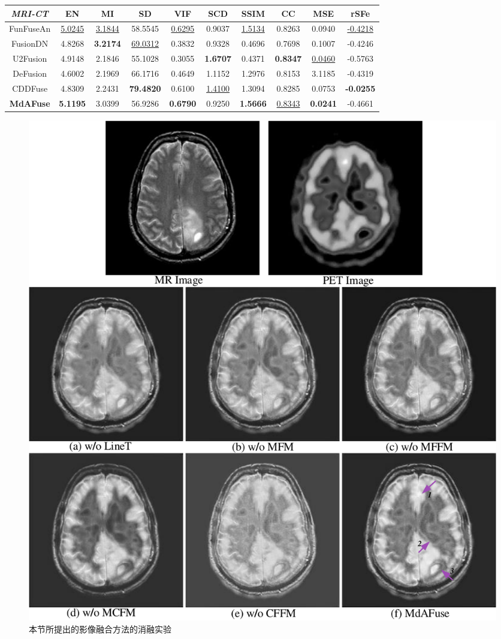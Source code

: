 \begin{table}[htb]
\begin{tabular}{cccccccccc}
\textit{MRI-CT}             & \textbf{EN}     & \textbf{MI}     & \textbf{SD}      & \textbf{VIF}   & \textbf{SCD}    & \textbf{SSIM}   & \textbf{CC}     & \textbf{MSE}    & \textbf{rSFe}    \\ \hline
FunFuseAn                 & \underline{ 5.0245}    & \underline{ 3.1844}    & 58.5545          & \underline{ 0.6295}    & 0.9037          & \underline{ 1.5134}    & 0.8263          & 0.0940          & \underline{ -0.4218}    \\
FusionDN                   & 4.8268          & \textbf{3.2174} & \underline{ 69.0312}    & 0.3832          & 0.9328          & 0.4696          & 0.7698          & 0.1007          & -0.4246          \\
U2Fusion                     & 4.9148          & 2.1846          & 55.1028          & 0.3055          & \textbf{1.6707} & 0.4371          & \textbf{0.8347} & \underline{ 0.0460}    & -0.5763          \\
DeFusion                       & 4.6002          & 2.1969          & 66.1716          & 0.4649          & 1.1152          & 1.2976          & 0.8153          & 3.1185          & -0.4319          \\
CDDFuse                  & 4.8309          & 2.2431          & \textbf{79.4820} & 0.6100          & \underline{ 1.4100}    & 1.3094          & 0.8285          & 0.0753          & \textbf{-0.0255} \\
\textbf{MdAFuse}                    & \textbf{5.1195} & 3.0399          & 56.9286          & \textbf{0.6790} & 0.9250          & \textbf{1.5666} & \underline{ 0.8343}    & \textbf{0.0241} & -0.4661         \\\hline
\end{tabular}
\end{table}

 
    \begin{figure}[htbp]
      \centering
      \includegraphics[width=0.85\columnwidth]{figs/paper2ablation1.pdf}
      \caption{本节所提出的影像融合方法的消融实验}\label{paper2ablation}
    \end{figure}

